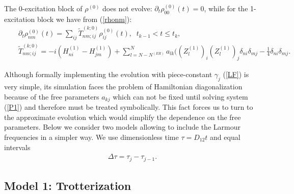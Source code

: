 \documentclass[pra,preprint,showpacs]{revtex4-1}
\begin{document}
The 0-excitation block of $\rho^{(0)}$ does not evolve: $\partial_t \rho^{(0)}_{00}(t)=0$,
while for the 1-excitation block we have from (\ref{rhonm}):
\begin{eqnarray}
\label{rhonm0}
&&
\partial_t\rho^{(0)}_{nm}(t) = \sum_{ij} \tilde T^{(k;0)}_{nm;ij}\rho^{(0)}_{ij}(t), \;\; t_{k-1} < t \le t_k,\\\nonumber
&&
\tilde T^{(k;0)}_{nm;ij}= -i (H^{(1)}_{ni} - H^{(1)}_{jm}) + \sum_{l=N-N^{(ER)}}^N a_{lk} ((Z^{(1)}_l)_i (Z^{(1)}_l)_j \delta_{ni}\delta_{mj} - \frac{1}{4} \delta_{ni}\delta_{mj}.
\end{eqnarray}
\fi

Although  formally  implementing  the evolution with  piece-constant $\gamma_j$  (\ref{LF}) is very simple,
its simulation faces the problem of  Hamiltonian diagonalization because of the free parameters $a_{kj}$ which can not be fixed until solving system (\ref{P1}) {and therefore must be treated symbolically}. This fact  forces us to turn to the approximate evolution which would simplify the dependence on the free parameters.
Below we consider two models allowing to include the Larmour frequencies in a simpler way. We use dimensionless time $\tau = D_{12} t$ and equal intervals
\begin{eqnarray}\label{dtau}
\Delta\tau = \tau_j-\tau_{j-1}.%
\end{eqnarray}

\subsection{Model 1: Trotterization}
\end{document}
